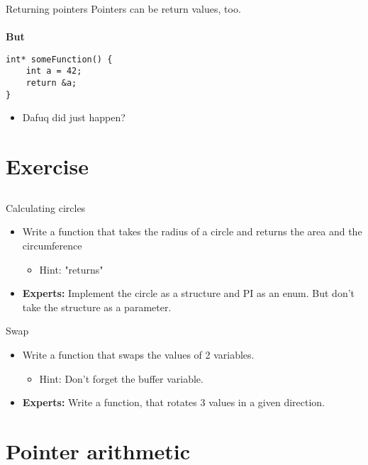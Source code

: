 \begin{frame}[fragile]{Returning pointers}
Pointers can be return values, too.\\\ \\
\textbf{But} 
	\begin{lstlisting}[numbers=none]
int* someFunction() {	
	int a = 42;
	return &a;
}
\end{lstlisting}
	\begin{itemize}
		\item Dafuq did just happen?
	\end{itemize}
\end{frame}
\section{Exercise}
\subsection{}
\begin{frame}{Calculating circles}
	\begin{itemize}
		\item Write a function that takes the radius of a circle and returns the area and the circumference
		\begin{itemize}
			\item<2-> Hint: "returns"
		\end{itemize}
		\item \textbf{Experts:} Implement the circle as a structure and PI as an enum. But don't take the structure as a parameter.
	\end{itemize}
\end{frame}
\begin{frame}{Swap}
	\begin{itemize}
		\item Write a function that swaps the values of 2 variables.
		\begin{itemize}
			\item<2-> Hint: Don't forget the buffer variable.
		\end{itemize}
		\item \textbf{Experts:} Write a function, that rotates 3 values in a given direction.
	\end{itemize}
\end{frame}
\section{Pointer arithmetic}
